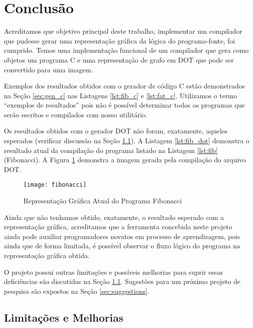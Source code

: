\section{Conclusão}
Acreditamos que objetivo principal deste trabalho, implementar um compilador
que pudesse gerar uma representação gráfica da lógica do programa-fonte,
foi cumprido. Temos uma implementação funcional de um compilador que gera
como objetos um programa C e uma representação de grafo em DOT que pode ser
convertido para uma imagem.

Exemplos dos resultados obtidos com o gerador de código C estão demonstrados
na Seção \ref{sec:gen_c} nas Listagens \ref{lst:fib_c} e \ref{lst:fat_c}.
Utilizamos o termo ``exemplos de resultados'' pois não é possível
determinar todos os programas que serão escritos e compilados com nosso
utilitário.

Os resultados obtidos com o gerador DOT não foram, exatamente, aqueles
esperados (verificar discussão na Seção \ref{sec:limitations}). A Listagem
\ref{lst:fib_dot} demonstra o resultado atual da compilação do programa
listado na Listagem \ref{lst:fib} (Fibonacci). A Figura \ref{fig:fibonacci}
demonstra a imagem gerada pela compilação do arquivo DOT.



\begin{figure}[h!]
	\begin{center}
		\texttt{[image: fibonacci]}
	\end{center}
	\caption{Representação Gráfica Atual do Programa Fibonacci}
	\label{fig:fibonacci}
\end{figure}

Ainda que não tenhamos obtido, exatamente, o resultado esperado com a
representação gráfica, acreditamos que a ferramenta concebida neste projeto
ainda pode auxiliar programadores novatos em processo de aprendizagem, pois
ainda que de forma limitada, é possível observar o fluxo lógico do programa na
representação gráfica obtida.

O projeto possui outras limitações e possíveis melhorias para suprir essas
deficiências são discutidas na Seção \ref{sec:limitations}. Sugestões para um
próximo projeto de pesquisa são expostos na Seção \ref{sec:suggestions}.


\subsection{Limitações e Melhorias}
\label{sec:limitations}

